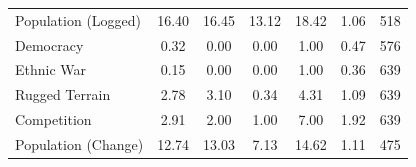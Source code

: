 \documentclass[12pt, letterpaper]{article}
\begin{document}
\begin{table}[htbp]
\begin{tabular}{l*{1}{cccccc}}
Population (Logged) &       16.40&       16.45&       13.12&       18.42&        1.06&         518\\
Democracy           &        0.32&        0.00&        0.00&        1.00&        0.47&         576\\
Ethnic War          &        0.15&        0.00&        0.00&        1.00&        0.36&         639\\
Rugged Terrain      &        2.78&        3.10&        0.34&        4.31&        1.09&         639\\
Competition         &        2.91&        2.00&        1.00&        7.00&        1.92&         639\\
Population (Change) &       12.74&       13.03&        7.13&       14.62&        1.11&         475\\
\hline\hline
\end{tabular}
\end{table}
\end{document}
